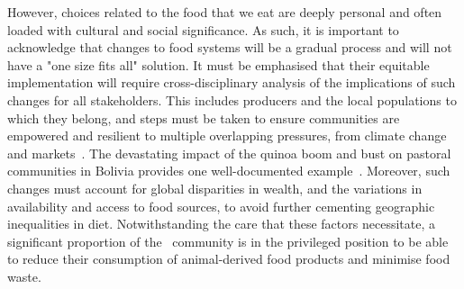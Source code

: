 \documentclass[../SustainableHEP.tex]{subfiles}
\begin{document}
 However, choices related to the food that we eat are deeply personal and often loaded with cultural and social significance. As such, it is important to acknowledge that changes to food systems will be a gradual process and will not have a "one size fits all" solution.  It must be emphasised that their equitable implementation will require cross-disciplinary analysis of the implications of such changes for all stakeholders. This includes producers and the local populations to which they belong, and steps must be taken to ensure communities are empowered and resilient to multiple overlapping pressures, from climate change and markets~\cite{WalshDilley2020}. The devastating impact of the quinoa boom and bust on pastoral communities in Bolivia provides one well-documented example~\cite{WalshDilley2020, Rodas2021}. Moreover, such changes must account for global disparities in wealth, and the variations in availability and access to food sources, to avoid further cementing geographic inequalities in diet. Notwithstanding the care that these factors necessitate, a significant proportion of the \ACR\ community is in the privileged position to be able to reduce their consumption of animal-derived food products and minimise food waste.

\end{document}
